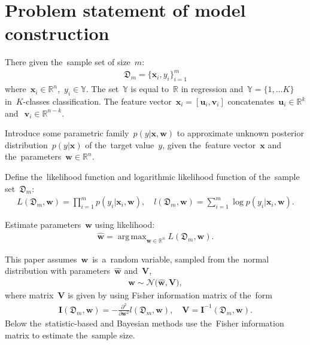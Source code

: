 \documentclass[
11pt,%
tightenlines,%
twoside,%
onecolumn,%
nofloats,%
nobibnotes,%
nofootinbib,%
superscriptaddress,%
noshowpacs,%
centertags]%
{revtex4}
\DeclareMathOperator*{\argmax}{arg\,max}
\begin{document}
\section{Problem statement of model construction}
There given the~sample set of size~$m$:
\[
\label{eq:ps:1}
\begin{aligned}
	\mathfrak{D}_{m} = \{\mathbf{x}_i, y_i\}_{i = 1}^{m}
\end{aligned}
\]
where~$\mathbf{x}_i\in \mathbb{R}^{n}$,~$y_i\in \mathbb{Y}$. The set~$\mathbb{Y}$ is equal to~$\mathbb{R}$ in regression and~$\mathbb{Y}=\{1,\dots K\}$ in~$K$-classes classification. The feature vector~$\mathbf{x}_{i} = [\mathbf{u}_{i}, \mathbf{v}_{i}]$ concatenates~$\mathbf{u}_i\in \mathbb{R}^{k}$ and~$~\mathbf{v}_i\in \mathbb{R}^{n-k}$.

Introduce some parametric family~$p(y|\mathbf{x}, \mathbf{w})$ to approximate unknown posterior distribution~$p(y|\mathbf{x})$ of the~target value~$y$, given the~feature vector~$\mathbf{x}$ and the~parameters~$\mathbf{w}\in \mathbb{R}^{n}$.

Define the~likelihood function and logarithmic likelihood function of the~sample set~$\mathfrak{D}_{m}$:
\[
\label{eq:ps:4}
\begin{aligned}
	L\left(\mathfrak{D}_{m}, \mathbf{w}\right) = \prod_{i=1}^{m} p\left(y_{i}|\mathbf{x}_{i}, \mathbf{w}\right),\quad l\left(\mathfrak{D}_{m}, \mathbf{w}\right) = \sum_{i=1}^{m} \log p\left(y_i|\mathbf{x}_{i}, \mathbf{w}\right).
\end{aligned}
\]

Estimate parameters~$\mathbf{w}$ using likelihood:
\[
\label{eq:ps:5}
\begin{aligned}
	\hat{\mathbf{w}} = \argmax_{\mathbf{w}\in\mathbb{R}^{n}}L\left(\mathfrak{D}_{m}, \mathbf{w}\right).
\end{aligned}
\]

This paper assumes~$\mathbf{w}$~is~a~random variable, sampled from the~normal distribution with parameters~$\hat{\mathbf{w}}$ and~$\mathbf{V}$,
\[
\label{eq:ps:5'}
\begin{aligned}
 \mathbf{w} \sim \mathcal{N}\bigr(\hat{\mathbf{w}}, \mathbf{V}\bigr),
\end{aligned}
\]
where matrix~$\mathbf{V}$ is given by using Fisher information matrix of the~form
\[
\label{eq:ps:6}
\begin{aligned}
	\mathbf{I}\left(\mathfrak{D}_{m}, \mathbf{w}\right) = -\frac{\partial^2}{\partial \mathbf{w}^{2}}l\left(\mathfrak{D}_{m}, \mathbf{w}\right), \quad \mathbf{V} = \mathbf{I}^{-1}\left(\mathfrak{D}_{m}, \mathbf{w}\right).
\end{aligned}
\]
Below the~statistic-based and Bayesian methods use the~Fisher information matrix to estimate the~sample size.
\end{document}

